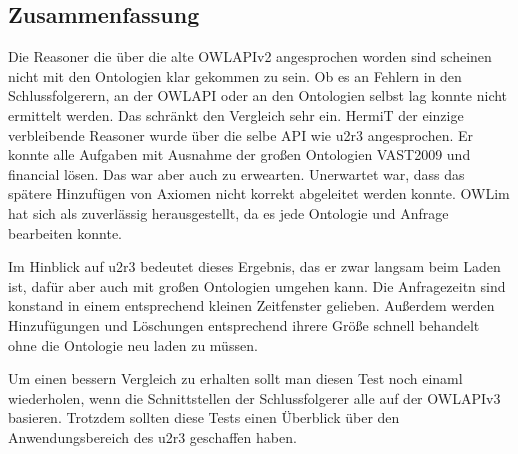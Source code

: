 \subsection{Zusammenfassung}
Die Reasoner die über die alte OWLAPIv2 angesprochen worden sind scheinen nicht mit den Ontologien klar gekommen zu sein. Ob es an Fehlern in den Schlussfolgerern, an der OWLAPI oder an den Ontologien selbst lag konnte nicht ermittelt werden. Das schränkt den Vergleich sehr ein. HermiT der einzige verbleibende Reasoner wurde über die selbe API wie u2r3 angesprochen. Er konnte alle Aufgaben mit Ausnahme der großen Ontologien VAST2009 und financial lösen. Das war aber auch zu erwearten. Unerwartet war, dass das spätere Hinzufügen von Axiomen nicht korrekt abgeleitet werden konnte. OWLim hat sich als zuverlässig herausgestellt, da es jede Ontologie und Anfrage bearbeiten konnte.

Im Hinblick auf u2r3 bedeutet dieses Ergebnis, das er zwar langsam beim Laden ist, dafür aber auch mit großen Ontologien umgehen kann. Die Anfragezeitn sind konstand in einem entsprechend kleinen Zeitfenster gelieben. Außerdem werden Hinzufügungen und Löschungen entsprechend ihrere Größe schnell behandelt ohne die Ontologie neu laden zu müssen.

Um einen bessern Vergleich zu erhalten sollt man diesen Test noch einaml wiederholen, wenn die Schnittstellen der Schlussfolgerer alle auf der OWLAPIv3 basieren. Trotzdem sollten diese Tests einen Überblick über den Anwendungsbereich des u2r3 geschaffen haben.

